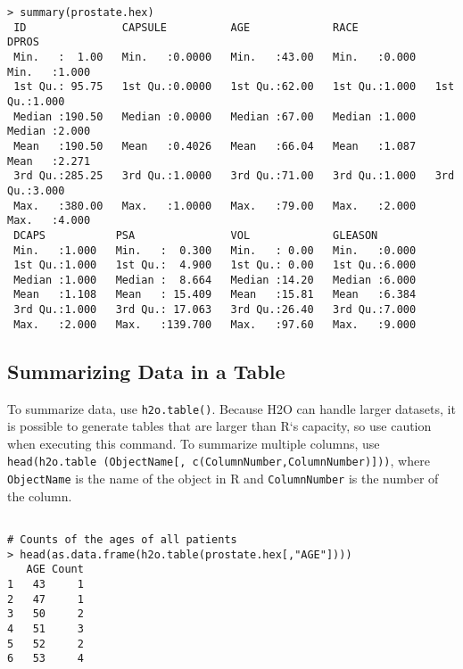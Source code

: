 {{\waterExampleInR
\medskip

\small
\begin{lstlisting}[style=R]
> summary(prostate.hex)
 ID               CAPSULE          AGE             RACE            DPROS          
 Min.   :  1.00   Min.   :0.0000   Min.   :43.00   Min.   :0.000   Min.   :1.000  
 1st Qu.: 95.75   1st Qu.:0.0000   1st Qu.:62.00   1st Qu.:1.000   1st Qu.:1.000  
 Median :190.50   Median :0.0000   Median :67.00   Median :1.000   Median :2.000  
 Mean   :190.50   Mean   :0.4026   Mean   :66.04   Mean   :1.087   Mean   :2.271  
 3rd Qu.:285.25   3rd Qu.:1.0000   3rd Qu.:71.00   3rd Qu.:1.000   3rd Qu.:3.000  
 Max.   :380.00   Max.   :1.0000   Max.   :79.00   Max.   :2.000   Max.   :4.000  
 DCAPS           PSA               VOL             GLEASON        
 Min.   :1.000   Min.   :  0.300   Min.   : 0.00   Min.   :0.000  
 1st Qu.:1.000   1st Qu.:  4.900   1st Qu.: 0.00   1st Qu.:6.000  
 Median :1.000   Median :  8.664   Median :14.20   Median :6.000  
 Mean   :1.108   Mean   : 15.409   Mean   :15.81   Mean   :6.384  
 3rd Qu.:1.000   3rd Qu.: 17.063   3rd Qu.:26.40   3rd Qu.:7.000  
 Max.   :2.000   Max.   :139.700   Max.   :97.60   Max.   :9.000
\end{lstlisting}
\normalsize

\subsection{Summarizing Data in a Table}


To summarize data, use {\texttt{h2o.table()}}. Because H2O can handle larger datasets, it is possible to generate tables that are larger than R`s capacity, so use caution when executing this command.
To summarize multiple columns, use {\texttt{head(h2o.table (ObjectName[, c(ColumnNumber,ColumnNumber)]))}}, where {\texttt{ObjectName}} is the name of the object in R and {\texttt{ColumnNumber}} is the number of the column.

\waterExampleInR
\medskip
\begin{lstlisting}[style=R]

# Counts of the ages of all patients
> head(as.data.frame(h2o.table(prostate.hex[,"AGE"])))
   AGE Count
1   43     1
2   47     1
3   50     2
4   51     3
5   52     2
6   53     4


\end{lstlisting}}}
